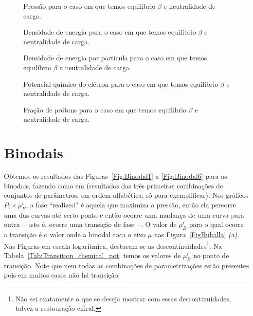 \begin{figure}
	
	\caption{Pressão para o caso em que temos equilíbrio $\beta$ e neutralidade de carga. \protect}
	\label{Fig:Pressure_beta_equil}
\end{figure}

\begin{figure}
	
	\caption{Densidade de energia para o caso em que temos equilíbrio $\beta$ e neutralidade de carga. \protect}
	\label{Fig:energy_density_beta_equil}
\end{figure}

\begin{figure}
	
	\caption{Densidade de energia por partícula para o caso em que temos equilíbrio $\beta$ e neutralidade de carga. \protect}
	\label{Fig:energy_per_particle_beta_equil}
\end{figure}

\begin{figure}
	
	\caption{Potencial químico do elétron para o caso em que temos equilíbrio $\beta$ e neutralidade de carga. \protect}
	\label{Fig:Electron_chemical_potential_beta_equil}
\end{figure}

\begin{figure}
	
	\caption{Fração de prótons para o caso em que temos equilíbrio $\beta$ e neutralidade de carga. \protect}
	\label{Fig:Proton_fraction_beta_equil}
\end{figure}

\section{Binodais}

Obtemos os resultados das Figuras~\ref{Fig:Binodal1} a \ref{Fig:Binodal6} para as binodais, fazendo como em \textcite{japoneses2} (resultados das três primeiras combinações de conjuntos de parâmetros, em ordem alfabética, só para exemplificar). Nos gráficos $P_i \times \mu_B^i$, a fase ``realized'' é aquela que maximiza a pressão, então ela percorre uma das curvas até certo ponto e então ocorre uma mudança de uma curva para outra --~isto é, ocorre uma transição de fase~--. O valor de $\mu_B^i$ para o qual ocorre a transição é o valor onde a binodal toca o eixo $\mu$ nas Figura~\ref{FigBuballa} \emph{(a)}. Nas Figuras em escala logarítmica, destacam-se as descontinuidades\footnote{Não sei exatamente o que se deseja mostrar com essas descontinuidades, talvez a restauração chiral.}. Na Tabela~\ref{Tab:Transition_chemical_pot} temos os valores de $\mu_B^i$ no ponto de transição. Note que nem todas as combinações de parametrizações estão presentes pois em muitos casos não há transição.


